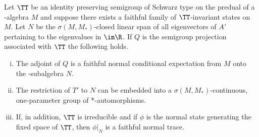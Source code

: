 \begin{theorem}\label{thm:d4-3.5}
Let $\TT$ be an identity preserving semigroup of Schwarz type on the predual of a \WA-algebra $M$ and suppose there exists a faithful family of\/ $\TT$-invariant states on $M$.
Let $N$ be the $\sigma(M,M_{*})$-closed linear span of all eigenvectors of $A'$ pertaining to the eigenvalues in $\im\R$.
If $Q$ is the semigroup projection associated with $\TT$ the following holds.
\begin{enumerate}[(i)]
\item 
The adjoint of $Q$ is a faithful normal conditional expectation from $M$ onto the \WA-subalgebra $N$.

\item 
The restriction of $T'$ to $N$ can be embedded into a $\sigma(M,M_{*})$-continuous, one-parameter group of *-automorphisms.

\item 
If, in addition, $\TT$ is irreducible and if $\phi$ is the normal state generating the fixed space of\/ $\TT$, then $\phi|_{N}$ is a faithful normal trace.

\end{enumerate}
\end{theorem}
